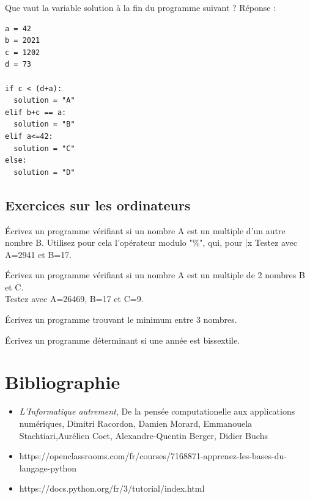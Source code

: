 \documentclass[11pt, a4paper]{book}
\begin{document}
\begin{exercice}
Que vaut la variable solution à la fin du programme suivant ?  %
Réponse : 
\end{exercice}

\begin{lstlisting}
a = 42
b = 2021
c = 1202
d = 73

if c < (d+a):
  solution = "A"
elif b+c == a:
  solution = "B"
elif a<=42:
  solution = "C"
else:
  solution = "D"

\end{lstlisting}



\subsection{Exercices sur les ordinateurs}

\begin{exercice}
Écrivez un programme vérifiant si un nombre A est un multiple d'un autre nombre B. 
Utilisez pour cela l'opérateur modulo "\%", qui, pour |x%
Testez avec A=2941 et B=17.
\end{exercice}


\begin{exercice}
Écrivez un programme vérifiant si un nombre A est un multiple de 2 nombres B et C.\\ 
Testez avec A=26469, B=17 et C=9.
\end{exercice}


\begin{exercice}
\label{exo:min}
Écrivez un programme trouvant le minimum entre 3 nombres.
\end{exercice}

\begin{exercice}
Écrivez un programme déterminant si une année est bissextile.
\end{exercice}




\section{Bibliographie}
\begin{itemize}
\item  \textit{L’Informatique autrement}, De la pensée computationelle aux applications numériques, Dimitri Racordon, Damien Morard, Emmanouela Stachtiari,Aurélien Coet, Alexandre-Quentin Berger, Didier Buchs 
\item  https://openclassrooms.com/fr/courses/7168871-apprenez-les-bases-du-langage-python
\item  https://docs.python.org/fr/3/tutorial/index.html
\end{itemize}
\end{document}
